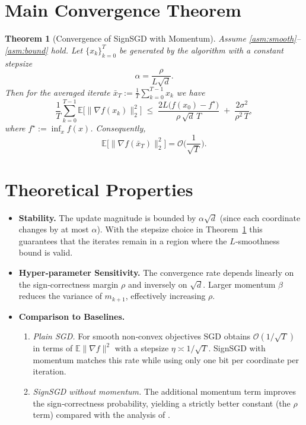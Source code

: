 \documentclass{article}
\newtheorem{theorem}{Theorem}
\begin{document}
\section*{Main Convergence Theorem}
\begin{theorem}[Convergence of SignSGD with Momentum]\label{thm:main}
Assume \ref{asm:smooth}–\ref{asm:bound} hold. Let $\{x_k\}_{k=0}^{T}$ be generated by the algorithm with a constant stepsize
\[
\alpha = \frac{\rho}{L\sqrt{d}} .
\]
Then for the averaged iterate $\bar{x}_T:=\frac1T\sum_{k=0}^{T-1}x_k$ we have
\[
\frac{1}{T}\sum_{k=0}^{T-1}\mathbb{E}\big[\|\nabla f(x_k)\|_2^2\big]
\;\le\;
\frac{2L\big(f(x_0)-f^\star\big)}{\rho\,\sqrt{d}\,T}
\;+\;
\frac{2\sigma^2}{\rho^2\,T},
\]
where $f^\star:=\inf_x f(x)$. Consequently,
\[
\mathbb{E}\big[\|\nabla f(\bar{x}_T)\|_2^2\big]=\mathcal{O}\!\Big(\frac{1}{\sqrt{T}}\Big).
\]
\end{theorem}

\section*{Theoretical Properties}
\begin{itemize}[leftmargin=*]
\item \textbf{Stability.} The update magnitude is bounded by $\alpha\sqrt{d}$ (since each coordinate changes by at most $\alpha$). With the stepsize choice in Theorem~\ref{thm:main} this guarantees that the iterates remain in a region where the $L$‑smoothness bound is valid.
\item \textbf{Hyper‑parameter Sensitivity.} The convergence rate depends linearly on the sign‑correctness margin $\rho$ and inversely on $\sqrt{d}$. Larger momentum $\beta$ reduces the variance of $m_{k+1}$, effectively increasing $\rho$.
\item \textbf{Comparison to Baselines.}
    \begin{enumerate}
        \item \emph{Plain SGD.} For smooth non‑convex objectives SGD obtains $\mathcal{O}(1/\sqrt{T})$ in terms of $\mathbb{E}\|\nabla f\|^2$ with a stepsize $\eta\asymp 1/\sqrt{T}$. SignSGD with momentum matches this rate while using only one bit per coordinate per iteration.
        \item \emph{SignSGD without momentum.} The additional momentum term improves the sign‑correctness probability, yielding a strictly better constant (the $\rho$ term) compared with the analysis of \cite{bernstein2018signsgd}.
    \end{enumerate}
\end{itemize}
\end{document}
